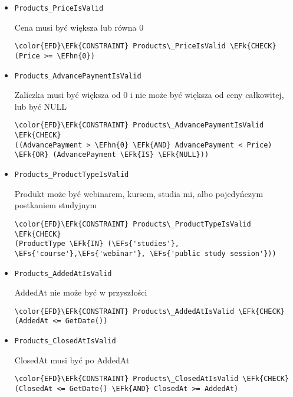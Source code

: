 \documentclass[11pt]{article}
\newcommand{\EFs}[1]{\textcolor{EFs}{#1}} %
\newcommand{\EFk}[1]{\textcolor{EFk}{\textbf{#1}}} %
\newcommand{\EFhn}[1]{\textcolor{EFhn}{#1}} %
\begin{document}
\begin{itemize}
\item \texttt{Products\_PriceIsValid}

Cena musi być większa lub równa 0
\begin{Code}
\begin{Verbatim}
\color{EFD}\EFk{CONSTRAINT} Products\_PriceIsValid \EFk{CHECK}
(Price >= \EFhn{0})
\end{Verbatim}
\end{Code}
\item \texttt{Products\_AdvancePaymentIsValid}

Zaliczka musi być większa od 0 i nie może być większa od ceny całkowitej, lub być NULL
\begin{Code}
\begin{Verbatim}
\color{EFD}\EFk{CONSTRAINT} Products\_AdvancePaymentIsValid \EFk{CHECK}
((AdvancePayment > \EFhn{0} \EFk{AND} AdvancePayment < Price)
\EFk{OR} (AdvancePayment \EFk{IS} \EFk{NULL}))
\end{Verbatim}
\end{Code}
\item \texttt{Products\_ProductTypeIsValid}

Produkt może być webinarem, kursem, studia mi, albo pojedyńczym postkaniem studyjnym
\begin{Code}
\begin{Verbatim}
\color{EFD}\EFk{CONSTRAINT} Products\_ProductTypeIsValid \EFk{CHECK}
(ProductType \EFk{IN} (\EFs{'studies'}, \EFs{'course'},\EFs{'webinar'}, \EFs{'public study session'}))
\end{Verbatim}
\end{Code}
\item \texttt{Products\_AddedAtIsValid}

AddedAt nie może być w przyszłości
\begin{Code}
\begin{Verbatim}
\color{EFD}\EFk{CONSTRAINT} Products\_AddedAtIsValid \EFk{CHECK}
(AddedAt <= GetDate())
\end{Verbatim}
\end{Code}
\item \texttt{Products\_ClosedAtIsValid}

ClosedAt musi być po AddedAt
\begin{Code}
\begin{Verbatim}
\color{EFD}\EFk{CONSTRAINT} Products\_ClosedAtIsValid \EFk{CHECK}
(ClosedAt <= GetDate() \EFk{AND} ClosedAt >= AddedAt)
\end{Verbatim}
\end{Code}
\end{itemize}
\end{document}
